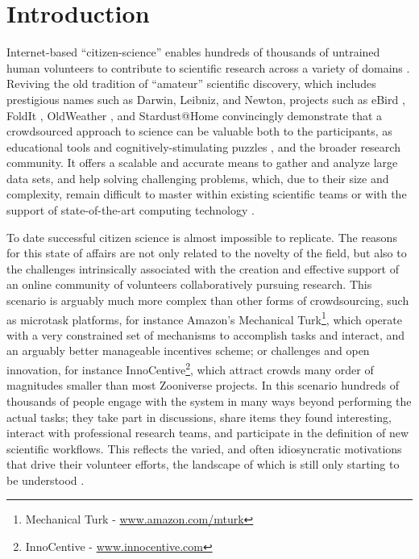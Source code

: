 \section{Introduction}

Internet-based ``citizen-science'' enables hundreds of thousands of untrained human volunteers to contribute to scientific research across a variety of domains \cite{citizen-science}. Reviving the old tradition of ``amateur'' scientific discovery, which includes prestigious names such as Darwin, Leibniz, and Newton, projects such as eBird \cite{eBird}, FoldIt \cite{foldit}, OldWeather \cite{oldweather}, and Stardust@Home \cite{stardust} convincingly demonstrate that a crowdsourced approach to science can be valuable both to the participants, as educational tools and cognitively-stimulating puzzles \cite{citizen-science-in-curricula}, and the broader research community. It offers a scalable and accurate means to gather and analyze large data sets, and help solving challenging problems, which, due to their size and complexity, remain difficult to master within existing scientific teams or with the support of state-of-the-art computing technology \cite{fortson-2011, lintott-08, lintott-11, simpson-12, davis-11}.

To date successful citizen science is almost impossible to replicate. The reasons for this state of affairs are not only related to the novelty of the field, but also to the challenges intrinsically associated with the creation and effective support of an online community of volunteers collaboratively pursuing research. This scenario is arguably much more complex than other forms of crowdsourcing, such as microtask platforms, for instance Amazon's Mechanical Turk\footnote{Mechanical Turk - \url{www.amazon.com/mturk}}, which operate with a very constrained set of mechanisms to accomplish tasks and interact, and an arguably better manageable incentives scheme; or challenges and open innovation, for instance InnoCentive\footnote{InnoCentive - \url{www.innocentive.com}}, which attract crowds many order of magnitudes smaller than most Zooniverse projects. In this scenario hundreds of thousands of people engage with the system in many ways beyond performing the actual tasks; they take part in discussions, share items they found interesting, interact with professional research teams, and participate in the definition of new scientific workflows. This reflects the varied, and often idiosyncratic motivations that drive their volunteer efforts, the landscape of which is still only starting to be understood \cite{raddick2010galaxy}. 

